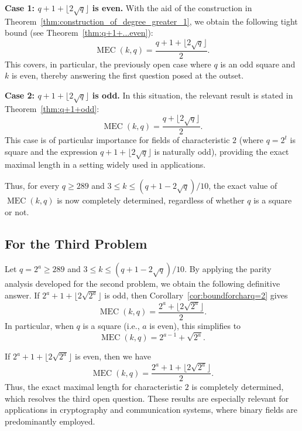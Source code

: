 \documentclass[journal,12pt,onecolumn]{IEEEtran}
\begin{document}
\noindent\textbf{Case 1: $q+1+ \lfloor 2\sqrt{q} \rfloor$ is even.}
With the aid of the construction in Theorem~\ref{thm:construction_of_degree_greater_1}, we obtain the following tight bound (see Theorem~\ref{thm:q+1+...even}):
\[
\operatorname{MEC}(k,q) = \frac{q+1+ \lfloor 2\sqrt{q} \rfloor}{2}.
\]
This covers, in particular, the previously open case where $q$ is an odd square and $k$ is even, thereby answering the first question posed at the outset.

\noindent\textbf{Case 2: $q+1+ \lfloor 2\sqrt{q} \rfloor$ is odd.}
In this situation, the relevant result is stated in Theorem~\ref{thm:q+1+odd}:
\[
\operatorname{MEC}(k,q) = \frac{q+ \lfloor 2\sqrt{q} \rfloor}{2}.
\]
This case is of particular importance for fields of characteristic $2$ (where $q = 2^{t}$ is square and the expression $q+1+ \lfloor 2\sqrt{q} \rfloor$ is naturally odd), providing the exact maximal length in a setting widely used in applications.

Thus, for every $q \ge 289$ and $3 \le k \le (q+1-2\sqrt{q})/10$, the exact value of $\operatorname{MEC}(k,q)$ is now completely determined, regardless of whether $q$ is a square or not.



\subsection{For the Third Problem}
Let $q = 2^{a} \ge 289$ and $3 \le k \le (q+1-2\sqrt{q})/10$.
 By applying the parity analysis developed for the second problem, we obtain the following definitive answer. If $2^{a}+1+\lfloor 2\sqrt{2^{a}}\rfloor$ is odd, then Corollary~\ref{cor:boundforcharq=2} gives
\[
\operatorname{MEC}(k,q) = \frac{2^{a} + \lfloor 2\sqrt{2^{a}} \rfloor}{2}.
\]
In particular, when $q$ is a square (i.e., $a$ is even), this simplifies to
\[
\operatorname{MEC}(k, q) = 2^{a-1} + \sqrt{2^a}.
\]

If $2^{a}+1+\lfloor 2\sqrt{2^{a}}\rfloor$ is even, then we have
\[
\operatorname{MEC}(k,q) = \frac{2^{a}+1 + \lfloor 2\sqrt{2^{a}} \rfloor}{2}.
\]
Thus, the exact maximal length for characteristic $2$ is completely determined, which resolves the third open question. These results are especially relevant for applications in cryptography and communication systems, where binary fields are predominantly employed.

 
\end{document}
